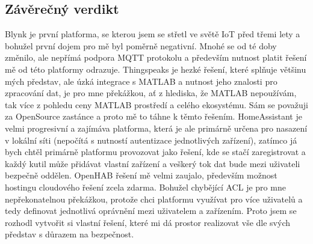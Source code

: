 \subsection{Závěrečný verdikt}
Blynk je první platforma, se kterou jsem se střetl ve světě IoT před třemi lety a bohužel první dojem pro mě byl poměrně negativní. Mnohé se od té doby změnilo, ale nepřímá podpora MQTT protokolu a především nutnost platit řešení mě od této platformy odrazuje. Thingspeaks je hezké řešení, které splňuje většinu mých představ, ale úzká integrace s MATLAB a nutnost jeho znalosti pro zpracování dat, je pro mne překážkou, ať z hlediska, že MATLAB nepoužívám, tak více z pohledu ceny MATLAB prostředí a celého ekosystému. Sám se považuji za OpenSource zastánce a proto mě to táhne k těmto řešením. HomeAssistant je velmi progresivní a zajímáva platforma, která je ale primárně určena pro nasazení v lokální síti (nepočítá s nutností autentizace jednotlivých zařízení), zatímco já bych chtěl primárně platformu provozovat jako řešení, kde se stačí zaregistrovat a každý kutil může přidávat vlastní zařízení a veškerý tok dat bude mezi uživateli bezpečně oddělen. OpenHAB řešení mě velmi zaujalo, především možnost hostingu cloudového řešení zcela zdarma. Bohužel chybějící ACL je pro mne nepřekonatelnou překážkou, protože chci platformu využívat pro více uživatelů a tedy definovat jednotlivá oprávnění mezi uživatelem a zařízením. Proto jsem se rozhodl vytvořit si vlastní řešení, které mi dá prostor realizovat vše dle svých představ s důrazem na bezpečnost.

